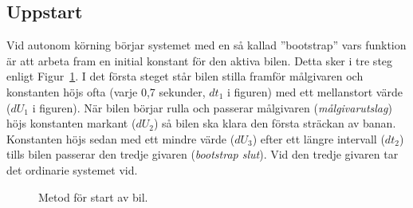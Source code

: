 \subsection{Uppstart} 
\label{sec:systembeskrivning:uppstart}


Vid autonom körning börjar systemet med en så kallad ''bootstrap'' vars funktion
är att arbeta fram en initial konstant för den aktiva bilen. Detta sker i tre
steg enligt Figur~\ref{fig:bootstrap}. I det första steget står bilen stilla
framför målgivaren och konstanten höjs ofta (varje 0,7 sekunder, $dt_1$ i
figuren) med ett mellanstort värde ($dU_1$ i figuren). När bilen börjar rulla
och passerar målgivaren (\emph{målgivarutslag}) höjs konstanten markant ($dU_2$)
så bilen ska klara den första sträckan av banan. Konstanten höjs sedan med ett
mindre värde ($dU_3$) efter ett längre intervall ($dt_2$) tills bilen passerar
den tredje givaren (\emph{bootstrap slut}). Vid den tredje givaren tar det
ordinarie systemet vid.

\begin{figure}
	\centering
	\caption{Metod för start av bil.}
	\label{fig:bootstrap}
\end{figure}
